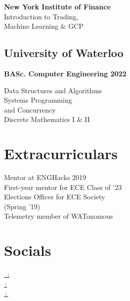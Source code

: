 \documentclass[]{deedy-resume-openfont}
\begin{document}
\begin{minipage}[t]{0.33\textwidth}
\textbf{New York Institute of Finance} \\
\textbullet{} Introduction to Trading,  \\
\hspace{0.65em} Machine Learning \& GCP 
\sectionsep
\subsection{University of Waterloo}
\textbf{BASc. Computer Engineering 2022}

\textbullet{} Data Structures and Algorithms \\
\textbullet{} Systems Programming \\
\hspace{0.7em}and Concurrency \\
\textbullet{} Discrete Mathematics I \& II \\



\sectionsep


\section{Extracurriculars} 
\textbullet{} Mentor at ENGHacks 2019 \\
\textbullet{} First-year mentor for ECE Class of '23 \\
\textbullet{} Elections Officer for ECE Society \\ 
\hspace{0.7em}(Spring '19) \\
\textbullet{} Telemetry member of WATonomous \\ 

\sectionsep


\section{Socials}
\href{https://www.linkedin.com/in/mhabaig/}{\faLinkedinSquare \, : } \\
\href{https://github.com/baighamza}{\faGithubSquare \,: } \\
\href{http://www.hamzais.me/}{\faGlobe\,:\,}




%
%

\end{minipage} 
\hfill
\end{document}
